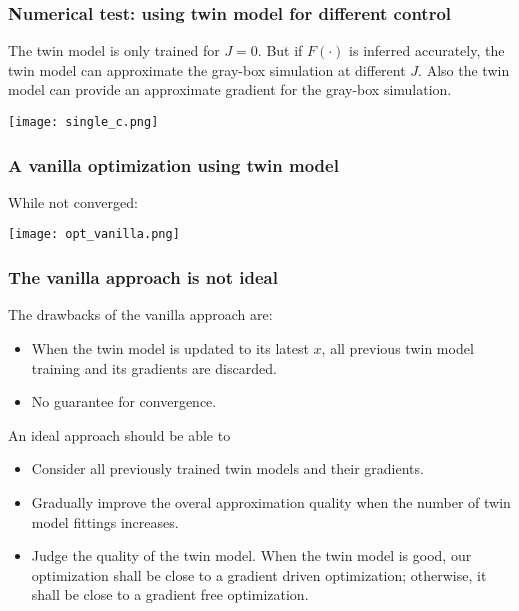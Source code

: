 \documentclass{beamer}
\begin{document}
\begin{frame}
    \frametitle{Numerical test: using twin model for different control}
    The twin model is only trained for $J=0$. But if $F(\cdot)$ is inferred accurately, 
    the twin model can approximate the gray-box simulation at different $J$.
    Also the twin model can provide an approximate gradient for the gray-box simulation.
    \begin{center}
        \texttt{[image: single\_c.png]}
    \end{center}
\end{frame}

\begin{frame}
    \frametitle{A vanilla optimization using twin model}
    \small While not converged:
    \begin{center}
        \texttt{[image: opt\_vanilla.png]}
    \end{center}
\end{frame}

\begin{frame}
    \frametitle{The vanilla approach is not ideal}
    The drawbacks of the vanilla approach are:
    \begin{itemize}
        \item When the twin model is updated to its latest $x$, all previous twin model training and its gradients are discarded.
        \item No guarantee for convergence.
    \end{itemize}
    \vspace{0.3cm}
    An ideal approach should be able to
    \begin{itemize}
        \item Consider all previously trained twin models and their gradients.
        \item Gradually improve the overal approximation quality when the number of twin model fittings increases.
        \item Judge the quality of the twin model. When the twin model is good, our optimization shall be close to 
              a gradient driven optimization; otherwise, it shall be close to a gradient free optimization.
    \end{itemize}
\end{frame}
\end{document}
